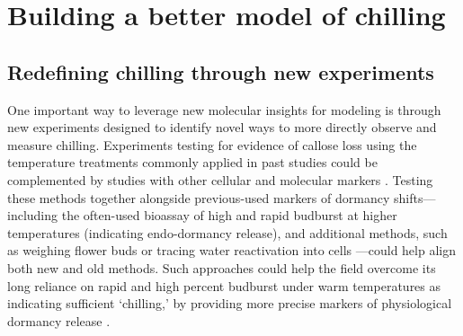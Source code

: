 \documentclass[11pt]{article}
\begin{document}

\section*{Building a better model of chilling} %

\subsection*{Redefining chilling through new experiments} 
One important way to leverage new molecular insights for modeling is through new experiments designed to identify novel ways to more directly observe and measure chilling. %
Experiments testing for evidence of callose loss using the temperature treatments commonly applied in past studies \citep{ospreebbms} could be complemented by studies with other cellular and molecular markers \citep{yu2024building}. Testing these methods together alongside previous-used markers of dormancy shifts---including the often-used bioassay of high and rapid budburst at higher temperatures (indicating endo-dormancy release), and additional methods, such as weighing flower buds \citep{chuine2016} or tracing water reactivation into cells \citep{faust1991bound,Kalcsits2009,walde2024stable}---could help align both new and old methods. Such approaches could help the field overcome its long reliance on rapid and high percent budburst under warm temperatures as indicating sufficient `chilling,' by providing more precise markers of physiological dormancy release \citep{fouche2023transport,walde2024stable}.
\end{document}
